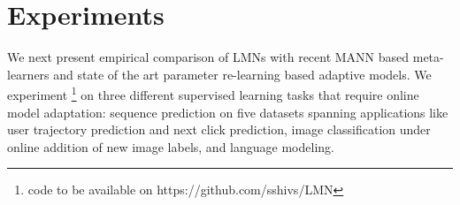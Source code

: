 \documentclass[letterpaper]{article} %
\newcommand{\vek}[1]{{\bf {#1}}}
\newcommand{\vh}{{\vek{h}}}
\begin{document}




\section{Experiments}
We next present empirical comparison of LMNs with recent MANN based meta-learners and state of the art parameter re-learning based adaptive models. We experiment \footnote{code to be available on https://github.com/sshivs/LMN} on three different supervised learning tasks that require online model adaptation: sequence prediction on five datasets spanning applications like user trajectory prediction and next click prediction,  image classification under online addition of new image labels, and language modeling.
\end{document}
